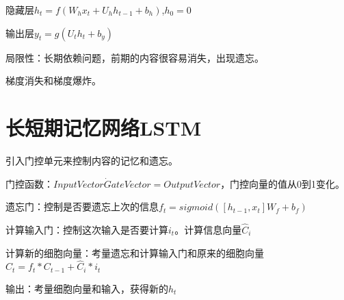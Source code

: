\documentclass[UTF8]{ctexart}
\begin{document}
隐藏层$h_t=f(W_hx_t+U_hh_{t-1}+b_h)$,$h_0=0$

输出层$y_t=g(U_th_{t}+b_y)$

局限性：长期依赖问题，前期的内容很容易消失，出现遗忘。

梯度消失和梯度爆炸。

\section{长短期记忆网络LSTM}

引入门控单元来控制内容的记忆和遗忘。

门控函数：$InputVector \dot GateVector = OutputVector$，门控向量的值从0到1变化。

遗忘门：控制是否要遗忘上次的信息$f_t=sigmoid([h_{t-1},x_t]W_f+b_f)$

计算输入门：控制这次输入是否要计算$i_t$。计算信息向量$\hat{C}_i$

计算新的细胞向量：考量遗忘和计算输入门和原来的细胞向量$C_t=f_t*C_{t-1}+\hat{C}_i*i_t$

输出：考量细胞向量和输入，获得新的$h_t$
\end{document}
